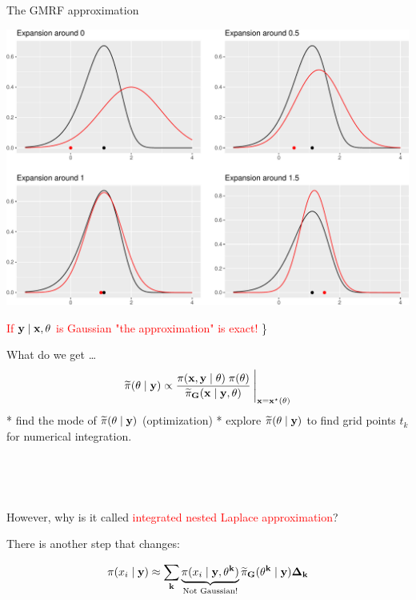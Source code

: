\documentclass[
  ignorenonframetext,
]{beamer}
\begin{document}
\begin{frame}{The GMRF approximation}
\protect\hypertarget{the-gmrf-approximation}{}
\begin{center}\includegraphics[width=0.6\linewidth]{Part1_intro_files/figure-beamer/unnamed-chunk-18-1} \end{center}

\textcolor{red}{If $\bf{y} \mid \bf{x}, \bf{\theta}$ is Gaussian "the approximation" is exact!}
\}
\end{frame}

\begin{frame}{What do we get \ldots{}}
\protect\hypertarget{what-do-we-get}{}
\[
\widetilde{\pi}(\bf{\theta} \mid \bf{y}) \propto  \frac{
           \pi(\bf{x}, \bf{y}\mid \bf{\theta})
        \; \pi(\bf{\theta})}{\widetilde{\pi}_G(\bf{x} \mid \bf{y},
            \bf{\theta})} \: \Bigg|_{\bf{x} = \bf{x}^\star(\bf{\theta})}
\] * find the mode of \(\widetilde{\pi}(\bf{\theta}\mid \bf{y})\)
(optimization) * explore \(\widetilde{\pi}(\bf{\theta}\mid \bf{y})\) to
find grid points \(t_k\) for numerical integration.\\
\strut \\
\strut \\

\pause

However, why is it called \textcolor{red}{integrated nested Laplace
      approximation}?

\pause

There is another step that changes:

\[
\pi(x_{i} \mid \bf{y}) \approx \sum_k \underbrace{\pi(x_{i} \mid \bf{y}, \theta^k)}_{{\text{Not Gaussian!}}}{\widetilde{\pi}_G(\theta^k\mid\bf{y})} \Delta_k
\]
\end{frame}
\end{document}
